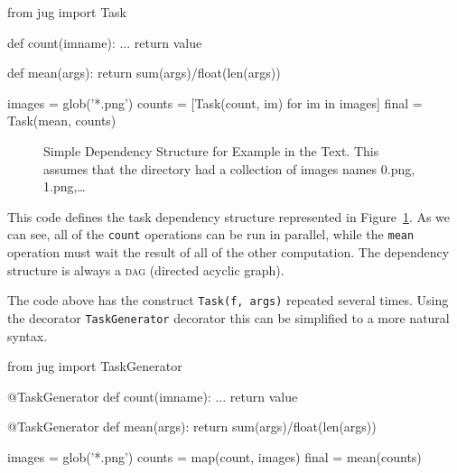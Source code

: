 \documentclass{article}
\let\code\texttt
\begin{document}
\begin{python}
from jug import Task

def count(imname):
    ...
    return value

def mean(args):
    return sum(args)/float(len(args))

images = glob('*.png')
counts = [Task(count, im) for im in images]
final = Task(mean, counts)
\end{python}

\begin{figure}
\begin{center}

\end{center}
\caption{Simple Dependency Structure for Example in the Text. This assumes that
the directory had a collection of images names 0.png, 1.png,\ldots}
\label{fig:jug-deps}
\end{figure}

This code defines the task dependency structure represented in
Figure~\ref{fig:jug-deps}. As we can see, all of the \code{count} operations
can be run in parallel, while the \code{mean} operation must wait the result of
all of the other computation. The dependency structure is always a \textsc{dag}
(directed acyclic graph).

The code above has the construct \code{Task(f, args)} repeated several times.
Using the decorator \code{TaskGenerator} decorator this can be simplified to a
more natural syntax.

\begin{python}
from jug import TaskGenerator

@TaskGenerator
def count(imname):
    ...
    return value

@TaskGenerator
def mean(args):
    return sum(args)/float(len(args))

images = glob('*.png')
counts = map(count, images)
final = mean(counts)
\end{python}
\end{document}
